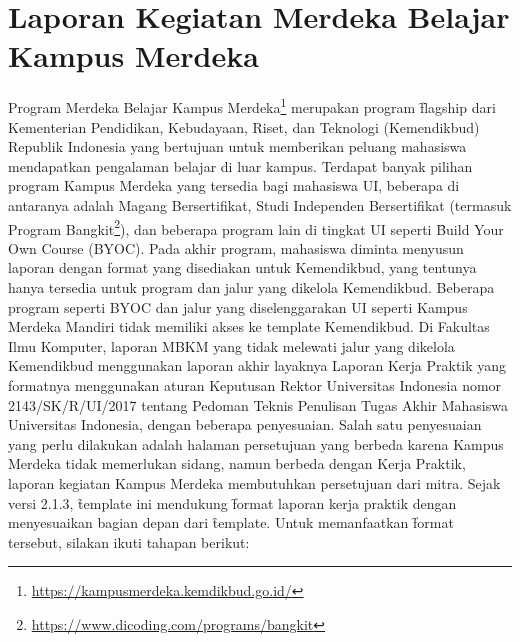 \section{Laporan Kegiatan Merdeka Belajar Kampus Merdeka}
\label{sec:laporanKampusMerdeka}
Program Merdeka Belajar Kampus Merdeka\footnote{\url{https://kampusmerdeka.kemdikbud.go.id/}} merupakan program \f{flagship} dari Kementerian Pendidikan, Kebudayaan, Riset, dan Teknologi (Kemendikbud) Republik Indonesia yang bertujuan untuk memberikan peluang mahasiswa mendapatkan pengalaman belajar di luar kampus.
Terdapat banyak pilihan program Kampus Merdeka yang tersedia bagi mahasiswa UI, beberapa di antaranya adalah Magang Bersertifikat, Studi Independen Bersertifikat (termasuk Program Bangkit\footnote{\url{https://www.dicoding.com/programs/bangkit}}), dan beberapa program lain di tingkat UI seperti \f{Build Your Own Course} (BYOC).
Pada akhir program, mahasiswa diminta menyusun laporan dengan format yang disediakan untuk Kemendikbud, yang tentunya hanya tersedia untuk program dan jalur yang dikelola Kemendikbud.
Beberapa program seperti BYOC dan jalur yang diselenggarakan UI seperti Kampus Merdeka Mandiri tidak memiliki akses ke template Kemendikbud.
Di Fakultas Ilmu Komputer, laporan MBKM yang tidak melewati jalur yang dikelola Kemendikbud menggunakan laporan akhir layaknya Laporan Kerja Praktik yang formatnya menggunakan aturan Keputusan Rektor Universitas Indonesia nomor 2143/SK/R/UI/2017 tentang Pedoman Teknis Penulisan Tugas Akhir Mahasiswa Universitas Indonesia, dengan beberapa penyesuaian.
Salah satu penyesuaian yang perlu dilakukan adalah halaman persetujuan yang berbeda karena Kampus Merdeka tidak memerlukan sidang, namun berbeda dengan Kerja Praktik, laporan kegiatan Kampus Merdeka membutuhkan persetujuan dari mitra.
Sejak versi 2.1.3, \f{template} ini mendukung \f{format} laporan kerja praktik dengan menyesuaikan bagian depan dari \f{template}.
Untuk memanfaatkan \f{format} tersebut, silakan ikuti tahapan berikut:
